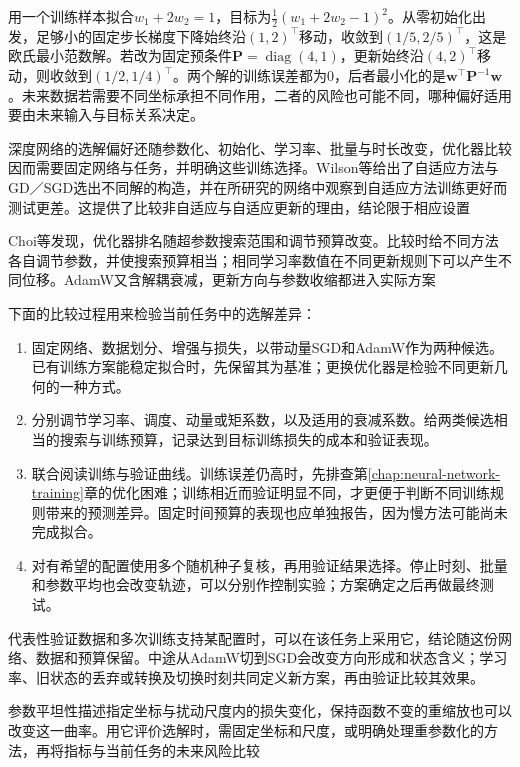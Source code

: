 \begin{example}[改变更新几何会改变选出的解]
  \label{ex:generalization-update-geometry}
  用一个训练样本拟合$w_1+2w_2=1$，目标为$\tfrac12(w_1+2w_2-1)^2$。从零初始化出发，足够小的固定步长梯度下降始终沿$(1,2)^{\top}$移动，收敛到$(1/5,2/5)^{\top}$，这是欧氏最小范数解。若改为固定预条件$\bm P=\operatorname{diag}(4,1)$，更新始终沿$(4,2)^{\top}$移动，则收敛到$(1/2,1/4)^{\top}$。两个解的训练误差都为0，后者最小化的是$\bm w^{\top}\bm P^{-1}\bm w$。未来数据若需要不同坐标承担不同作用，二者的风险也可能不同，哪种偏好适用要由未来输入与目标关系决定。
\end{example}

深度网络的选解偏好还随参数化、初始化、学习率、批量与时长改变，优化器比较因而需要固定网络与任务，并明确这些训练选择。Wilson等给出了自适应方法与GD／SGD选出不同解的构造，并在所研究的网络中观察到自适应方法训练更好而测试更差。这提供了比较非自适应与自适应更新的理由，结论限于相应设置

Choi等发现，优化器排名随超参数搜索范围和调节预算改变。比较时给不同方法各自调节参数，并使搜索预算相当；相同学习率数值在不同更新规则下可以产生不同位移。AdamW又含解耦衰减，更新方向与参数收缩都进入实际方案

下面的比较过程用来检验当前任务中的选解差异：
\begin{enumerate}
  \item 固定网络、数据划分、增强与损失，以带动量SGD和AdamW作为两种候选。已有训练方案能稳定拟合时，先保留其为基准；更换优化器是检验不同更新几何的一种方式。
  \item 分别调节学习率、调度、动量或矩系数，以及适用的衰减系数。给两类候选相当的搜索与训练预算，记录达到目标训练损失的成本和验证表现。
  \item 联合阅读训练与验证曲线。训练误差仍高时，先排查第\ref{chap:neural-network-training}章的优化困难；训练相近而验证明显不同，才更便于判断不同训练规则带来的预测差异。固定时间预算的表现也应单独报告，因为慢方法可能尚未完成拟合。
  \item 对有希望的配置使用多个随机种子复核，再用验证结果选择。停止时刻、批量和参数平均也会改变轨迹，可以分别作控制实验；方案确定之后再做最终测试。
\end{enumerate}

代表性验证数据和多次训练支持某配置时，可以在该任务上采用它，结论随这份网络、数据和预算保留。中途从AdamW切到SGD会改变方向形成和状态含义；学习率、旧状态的丢弃或转换及切换时刻共同定义新方案，再由验证比较其效果。

参数平坦性描述指定坐标与扰动尺度内的损失变化，保持函数不变的重缩放也可以改变这一曲率。用它评价选解时，需固定坐标和尺度，或明确处理重参数化的方法，再将指标与当前任务的未来风险比较

